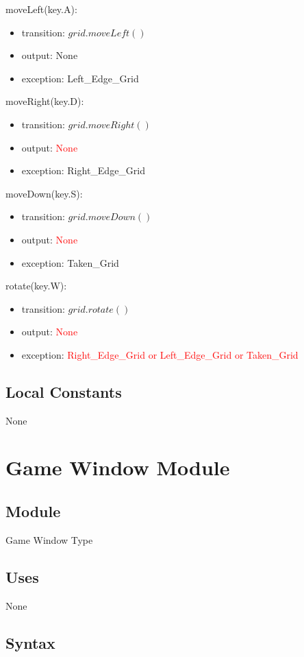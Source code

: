 \documentclass[12pt]{article}
\begin{document}
\noindent moveLeft(key.A):
\begin{itemize}
\item transition: $grid.moveLeft()$
\item output: None
\item exception: Left\_Edge\_Grid
\end{itemize}

\noindent moveRight(key.D):
\begin{itemize}
\item transition: $grid.moveRight()$
\item output: \textcolor{red}{None}
\item exception: Right\_Edge\_Grid
\end{itemize}

\noindent moveDown(key.S):
\begin{itemize}
\item transition: $grid.moveDown()$
\item output: \textcolor{red}{None}
\item exception: Taken\_Grid
\end{itemize}

\noindent rotate(key.W):
\begin{itemize}
\item transition: $grid.rotate()$
\item output: \textcolor{red}{None}
\item exception: \textcolor{red}{Right\_Edge\_Grid or Left\_Edge\_Grid or Taken\_Grid}
\end{itemize}

\subsection*{Local Constants}
None
\medskip
\newpage

\section* {Game Window Module}

\subsection*{Module}

Game Window Type

\subsection* {Uses}
None
\subsection* {Syntax}
\end{document}
